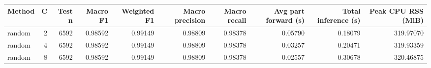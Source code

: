 \begin{tabular}{lrrrrrrrrr}
\toprule
Method & C & Test n & Macro F1 & Weighted F1 & Macro precision & Macro recall & Avg part forward (s) & Total inference (s) & Peak CPU RSS (MiB) \\
\midrule
random & 2 & 6592 & 0.98592 & 0.99149 & 0.98809 & 0.98378 & 0.05790 & 0.18079 & 319.97070 \\
random & 4 & 6592 & 0.98592 & 0.99149 & 0.98809 & 0.98378 & 0.03257 & 0.20471 & 319.93359 \\
random & 8 & 6592 & 0.98592 & 0.99149 & 0.98809 & 0.98378 & 0.02557 & 0.30678 & 320.46875 \\
\bottomrule
\end{tabular}
